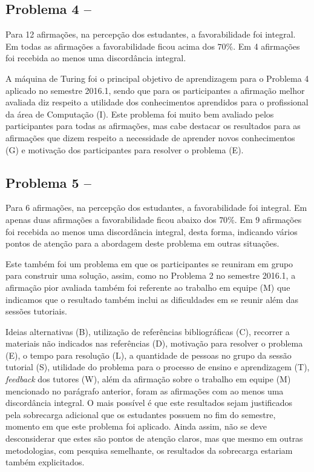 \subsection{Problema 4 -- \ProblemaD}

Para 12 afirmações, na percepção dos estudantes, a favorabilidade foi integral.
Em todas as afirmações a favorabilidade ficou acima dos $70\%$.
Em 4 afirmações foi recebida ao menos uma discordância integral.

A máquina de Turing foi o principal objetivo de aprendizagem para o Problema 4
aplicado no semestre 2016.1, sendo que para os participantes a afirmação
melhor avaliada diz respeito a utilidade dos conhecimentos aprendidos para 
o profissional da área de Computação (I).
Este problema foi muito bem avaliado pelos participantes para todas
as afirmações, mas cabe destacar os resultados para as afirmações que
dizem respeito a necessidade de aprender novos conhecimentos (G) e
motivação dos participantes para resolver o problema (E).


\subsection{Problema 5 -- \ProblemaE}

Para 6 afirmações, na percepção dos estudantes, a favorabilidade foi integral.
Em apenas duas afirmações a favorabilidade ficou abaixo dos $70\%$.
Em 9 afirmações foi recebida ao menos uma discordância integral, desta forma,
indicando vários pontos de atenção para a abordagem deste problema
em outras situações.

Este também foi um problema em que os participantes se reuniram em grupo para
construir uma solução, assim, como no Problema 2 no semestre 2016.1, a
afirmação pior avaliada também foi referente ao trabalho em equipe (M) que
indicamos que o resultado também inclui as dificuldades em se reunir além
das sessões tutoriais.

Ideias alternativas (B), utilização de referências bibliográficas (C),
recorrer a materiais não indicados nas referências (D), motivação
para resolver o problema (E), o tempo para resolução (L), a quantidade de
pessoas no grupo da sessão tutorial (S), utilidade do problema para o
processo de ensino e aprendizagem (T), \textit{feedback} dos
tutores (W), além da afirmação sobre o trabalho em equipe (M)
mencionado no parágrafo anterior, foram as afirmações com ao menos
uma discordância integral.
O mais possível é que este resultados sejam justificados pela sobrecarga
adicional que os estudantes possuem no fim do semestre, momento em que
este problema foi aplicado.
Ainda assim, não se deve desconsiderar que estes são pontos
de atenção claros, mas que mesmo em outras metodologias, com pesquisa
semelhante, os resultados da sobrecarga estariam também explicitados.

